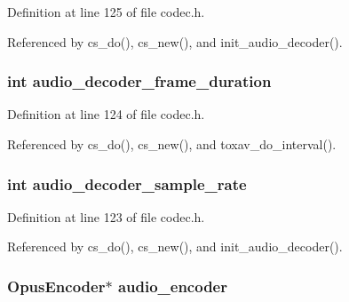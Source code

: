Definition at line 125 of file codec.\+h.



Referenced by cs\+\_\+do(), cs\+\_\+new(), and init\+\_\+audio\+\_\+decoder().

\hypertarget{struct___c_s_session_a245af4e824b82e6e91850ac26ace1230}{
\subsubsection[{audio\+\_\+decoder\+\_\+frame\+\_\+duration}]{\setlength{\rightskip}{0pt plus 5cm}int audio\+\_\+decoder\+\_\+frame\+\_\+duration}}\label{struct___c_s_session_a245af4e824b82e6e91850ac26ace1230}


Definition at line 124 of file codec.\+h.



Referenced by cs\+\_\+do(), cs\+\_\+new(), and toxav\+\_\+do\+\_\+interval().

\hypertarget{struct___c_s_session_a22979ca479f4d3e2660b604805a41833}{
\subsubsection[{audio\+\_\+decoder\+\_\+sample\+\_\+rate}]{\setlength{\rightskip}{0pt plus 5cm}int audio\+\_\+decoder\+\_\+sample\+\_\+rate}}\label{struct___c_s_session_a22979ca479f4d3e2660b604805a41833}


Definition at line 123 of file codec.\+h.



Referenced by cs\+\_\+do(), cs\+\_\+new(), and init\+\_\+audio\+\_\+decoder().

\hypertarget{struct___c_s_session_a8c1fa3d73f3426ba5cac83857c390ebc}{
\subsubsection[{audio\+\_\+encoder}]{\setlength{\rightskip}{0pt plus 5cm}Opus\+Encoder$\ast$ audio\+\_\+encoder}}\label{struct___c_s_session_a8c1fa3d73f3426ba5cac83857c390ebc}


